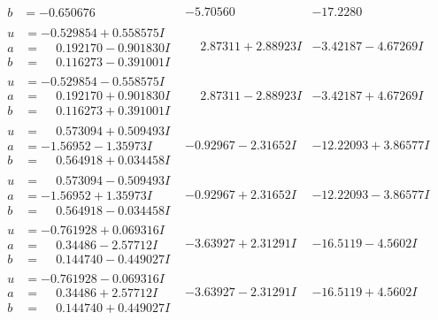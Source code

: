 \documentclass[1p]{elsarticle_modified}
\theoremstyle{definition}
\begin{document}
$$\begin{array}{c|c|c}
\begin{aligned}
b &= -0.650676\phantom{ +0.000000I}\end{aligned}
 & -5.70560\phantom{ +0.000000I} & -17.2280\phantom{ +0.000000I} \\ \hline\begin{aligned}
u &= -0.529854 + 0.558575 I \\
a &= \phantom{-}0.192170 - 0.901830 I \\
b &= \phantom{-}0.116273 - 0.391001 I\end{aligned}
 & \phantom{-}2.87311 + 2.88923 I & -3.42187 - 4.67269 I \\ \hline\begin{aligned}
u &= -0.529854 - 0.558575 I \\
a &= \phantom{-}0.192170 + 0.901830 I \\
b &= \phantom{-}0.116273 + 0.391001 I\end{aligned}
 & \phantom{-}2.87311 - 2.88923 I & -3.42187 + 4.67269 I \\ \hline\begin{aligned}
u &= \phantom{-}0.573094 + 0.509493 I \\
a &= -1.56952 - 1.35973 I \\
b &= \phantom{-}0.564918 + 0.034458 I\end{aligned}
 & -0.92967 - 2.31652 I & -12.22093 + 3.86577 I \\ \hline\begin{aligned}
u &= \phantom{-}0.573094 - 0.509493 I \\
a &= -1.56952 + 1.35973 I \\
b &= \phantom{-}0.564918 - 0.034458 I\end{aligned}
 & -0.92967 + 2.31652 I & -12.22093 - 3.86577 I \\ \hline\begin{aligned}
u &= -0.761928 + 0.069316 I \\
a &= \phantom{-}0.34486 - 2.57712 I \\
b &= \phantom{-}0.144740 - 0.449027 I\end{aligned}
 & -3.63927 + 2.31291 I & -16.5119 - 4.5602 I \\ \hline\begin{aligned}
u &= -0.761928 - 0.069316 I \\
a &= \phantom{-}0.34486 + 2.57712 I \\
b &= \phantom{-}0.144740 + 0.449027 I\end{aligned}
 & -3.63927 - 2.31291 I & -16.5119 + 4.5602 I \\ \hline\begin{aligned}

\end{aligned}
\end{array}$$
\end{document}
